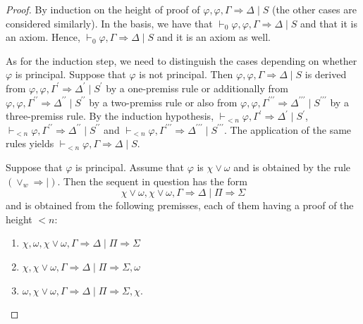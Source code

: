 \documentclass[11pt,a4paper,titlepage]{article}
\theoremstyle{definition}
\newcommand{\3}{\vspace{.3in}}
\newcommand{\2}{\vspace{.2in}}
\newcommand{\1}{\vspace{.1in}}
\newcommand{\5}{\vspace{.05in}}
\begin{document}
\begin{proof}
By induction on the height of proof of $ \varphi,\varphi,\Gamma
\Rightarrow \Delta \mid S $	(the other cases are considered similarly). In the basis, we have that $ \vdash_0\varphi,\varphi,\Gamma
\Rightarrow \Delta \mid S $ and that it is an axiom. Hence, $ \vdash_0\varphi,\Gamma
\Rightarrow \Delta \mid S $ and it is an axiom as well.

As for the induction step, we need to distinguish the cases depending on whether $ \varphi $ is principal. Suppose that $ \varphi $ is not principal. Then $ \varphi,\varphi,\Gamma
\Rightarrow \Delta \mid S $ is derived from $ \varphi,\varphi,\Gamma^\prime
\Rightarrow \Delta^\prime \mid S^\prime $ by a one-premiss
rule or additionally from $ \varphi,\varphi,\Gamma^{\prime\prime}
\Rightarrow \Delta^{\prime\prime} \mid S^{\prime\prime} $ by a two-premiss rule or also from $ \varphi,\varphi,\Gamma^{\prime\prime\prime}
\Rightarrow \Delta^{\prime\prime\prime} \mid S^{\prime\prime\prime} $ by a three-premiss rule. By the induction hypothesis, $\vdash_{<n} \varphi,\Gamma^\prime
\Rightarrow \Delta^\prime \mid S^\prime $, $\vdash_{<n} \varphi,\Gamma^{\prime\prime}
\Rightarrow \Delta^{\prime\prime} \mid S^{\prime\prime} $ and $\vdash_{<n} \varphi,\Gamma^{\prime\prime\prime}
\Rightarrow \Delta^{\prime\prime\prime} \mid S^{\prime\prime\prime} $. The application of the same rules yields $\vdash_{<n} \varphi,\Gamma
\Rightarrow \Delta \mid S $.

Suppose that $ \varphi $ is principal. Assume that $ \varphi $ is $ \chi\vee\omega $ and is obtained by the rule $ (\vee_w\Rightarrow\mid) $. Then the sequent in question has the form $$ \chi\vee\omega,\chi\vee\omega,\Gamma\Rightarrow\Delta\mid \Pi\Rightarrow\Sigma $$ and is obtained from the following premisses, each of them having a proof of the height $<n$: 
\begin{enumerate}\itemsep=0pt
\item $  \chi,\omega,\chi\vee\omega,\Gamma\Rightarrow\Delta\mid \Pi\Rightarrow\Sigma $
\item $ \chi,\chi\vee\omega,\Gamma\Rightarrow\Delta\mid \Pi\Rightarrow\Sigma,\omega $
\item $ \omega,\chi\vee\omega,\Gamma\Rightarrow\Delta\mid \Pi\Rightarrow\Sigma,\chi $.
\end{enumerate}


\end{proof}
\end{document}
